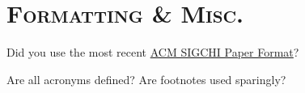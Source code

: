 \noindent\makebox[\linewidth]{\rule{\linewidth}{0.4pt}}
\section*{\textsc{Formatting \& Misc.}}
\vspace{0.5cm}

\begin{checklist}
 	\item Did you use the most recent \href{https://chi2021.acm.org/for-authors/chi-publication-formats}{ACM SIGCHI Paper Format}?
	\item Are all acronyms defined? Are footnotes used sparingly? 
\end{checklist}









